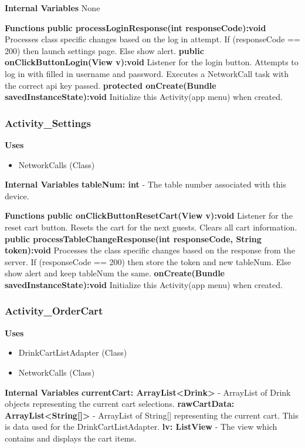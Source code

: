\documentclass [10pt]{article}
\begin{document}
\textbf{Internal Variables} None

\textbf{Functions}
\textbf{public processLoginResponse(int responseCode):void}
Processes class specific changes based on the log in attempt. If (responseCode == 200) then launch settings page. Else show alert.
\textbf{public onClickButtonLogin(View v):void}
Listener for the login button. Attempts to log in with filled in username and password. Executes a NetworkCall task with the correct api key passed.
\textbf{protected onCreate(Bundle savedInstanceState):void}
Initialize this Activity(app menu) when created.

\subsubsection{Activity\_Settings}

\textbf{Uses}
\begin{itemize}
	\item NetworkCalls (Class)
\end{itemize}

\textbf{Internal Variables}
\textbf{tableNum: int} - The table number associated with this device.

\textbf{Functions}
\textbf{public onClickButtonResetCart(View v):void}
Listener for the reset cart button. Resets the cart for the next guests. Clears all cart information.
\textbf{public processTableChangeResponse(int responseCode, String token):void}
Processes the class specific changes based on the response from the server. If (responseCode == 200) then store the token and new tableNum. Else show alert and keep tableNum the same.
\textbf{onCreate(Bundle savedInstanceState):void}
Initialize this Activity(app menu) when created.

\subsubsection{Activity\_OrderCart}

\textbf{Uses}

\begin{itemize}
	\item DrinkCartListAdapter (Class)
	\item NetworkCalls (Class)
\end{itemize}

\textbf{Internal Variables}
\textbf{currentCart: ArrayList<Drink>} - ArrayList of Drink objects representing the current cart selections.
\textbf{rawCartData: ArrayList<String[]>} - ArrayList of String[] representing the current cart. This is data used for the DrinkCartListAdapter.
\textbf{lv: ListView} - The view which contains and displays the cart items.
\end{document}
